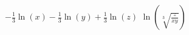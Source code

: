 {$-\frac{1}{3} \ln(x) - \frac{1}{3}\ln(y) + \frac{1}{3} \ln(z)$}
{ $\ln\left(\sqrt[3]{\frac{z}{xy}}   \right)$}

